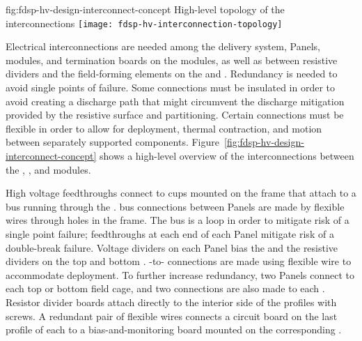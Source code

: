 \begin{dunefigure}{fig:fdsp-hv-design-interconnect-concept}
  {High-level topology of the  interconnections}
  \texttt{[image: fdsp-hv-interconnection-topology]}
\end{dunefigure}
Electrical interconnections are needed among the  delivery system,  Panels,  modules, and termination
boards on the  modules, as well as between resistive dividers and
the field-forming elements on the  and .  %
Redundancy is
needed to avoid single points of failure. 
Some connections must be
insulated in order to avoid creating a discharge path that might
circumvent the discharge mitigation provided by the resistive 
surface and  partitioning.  Certain connections must be
flexible in order to allow for  deployment, thermal
contraction, and motion between separately supported  components.  Figure~\ref{fig:fdsp-hv-design-interconnect-concept} shows a high-level
overview of the interconnections between the , , and  modules.


High voltage feedthroughs connect to cups mounted on the  frame
that attach to a  bus running through the .   bus connections
between  Panels are made by flexible wires through holes in the
 frame. The  bus is a loop in order to mitigate risk of a single
point failure; feedthroughs at each end of each  Panel mitigate
risk of a double-break failure.  Voltage dividers on each  Panel
bias the  and the resistive dividers on the top
and bottom .  -to- connections are made using
flexible wire to accommodate  deployment.  To further
increase redundancy, two  Panels connect to each top or bottom
field cage, and two connections are also made to each . Resistor divider boards attach directly to the interior side of
the  profiles with screws.   A redundant pair of flexible wires
connects a circuit board on the last profile of each  to a
bias-and-monitoring board mounted on the corresponding .

